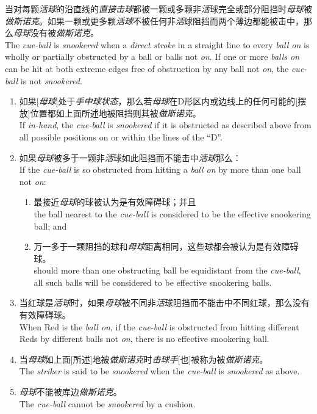 \noindent 当对每颗\emph{活球}的沿直线的\emph{直接击球}都被一颗或多颗非\emph{活}球完全或部分阻挡时\emph{母球}被\emph{做斯诺克}。如果一颗或更多颗\emph{活球}不被任何非\emph{活}球阻挡而两个薄边都能被击中，那么\emph{母球}没有被\emph{做斯诺克}。\\
The \emph{cue-ball} is \emph{snookered} when a \emph{direct stroke} in a straight line to every \emph{ball on} is wholly or partially obstructed by a ball or balls not \emph{on}. If one or more \emph{balls on} can be hit at both extreme edges free of obstruction by any ball not \emph{on}, the \emph{cue-ball} is not \emph{snookered}.
\begin{enumerate}[label=(\alph*)]
    \item 如果[\emph{母球}]处于\emph{手中球状态}，那么若\emph{母球}在D形区内或边线上的任何可能的[摆放]位置都如上面所述地被阻挡则其被\emph{做斯诺克}。\\
    If \emph{in-hand}, the \emph{cue-ball} is \emph{snookered} if it is obstructed as described above from all possible positions on or within the lines of the ``D''.
    \item 如果\emph{母球}被多于一颗非\emph{活}球如此阻挡而不能击中\emph{活球}那么：\\
    If the \emph{cue-ball} is so obstructed from hitting a \emph{ball on} by more than one ball not \emph{on}:
    \begin{enumerate}[label=(\roman*)]
        \item 最接近\emph{母球}的球被认为是有效障碍球；并且\\
        the ball nearest to the \emph{cue-ball} is considered to be the effective snookering ball; and
        \item 万一多于一颗阻挡的球和\emph{母球}距离相同，这些球都会被认为是有效障碍球。\\
        should more than one obstructing ball be equidistant from the \emph{cue-ball}, all such balls will be considered to be effective snookering balls.
    \end{enumerate}
    \item 当红球是\emph{活球}时，如果\emph{母球}被不同非\emph{活}球阻挡而不能击中不同红球，那么没有有效障碍球。\\
    When Red is the \emph{ball on}, if the \emph{cue-ball} is obstructed from hitting different Reds by different balls not \emph{on}, there is no effective snookering ball.
    \item 当\emph{母球}如上面[所述]地被\emph{做斯诺克}时\emph{击球手}[也]被称为被\emph{做斯诺克}。\\
    The \emph{striker} is said to be \emph{snookered} when the \emph{cue-ball} is \emph{snookered} as above.
    \item \emph{母球}不能被库边\emph{做斯诺克}。\\
    The \emph{cue-ball} cannot be \emph{snookered} by a cushion.
\end{enumerate}

